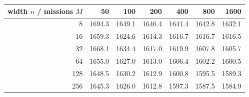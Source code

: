 \begin{tabular}{rrrrrrr}
\toprule
width $n$ / missions $M$ & 50 & 100 & 200 & 400 & 800 & 1600 \\
\midrule
8 & 1694.3 & 1649.1 & 1646.4 & 1641.4 & 1642.8 & 1632.1 \\
16 & 1659.3 & 1624.6 & 1614.3 & 1616.7 & 1616.7 & 1616.5 \\
32 & 1668.1 & 1634.4 & 1617.0 & 1619.9 & 1607.8 & 1605.7 \\
64 & 1655.0 & 1627.0 & 1613.0 & 1606.4 & 1602.2 & 1600.5 \\
128 & 1648.5 & 1630.2 & 1612.9 & 1600.8 & 1595.5 & 1589.3 \\
256 & 1645.3 & 1626.0 & 1612.8 & 1597.3 & 1587.5 & 1584.9 \\
\bottomrule
\end{tabular}